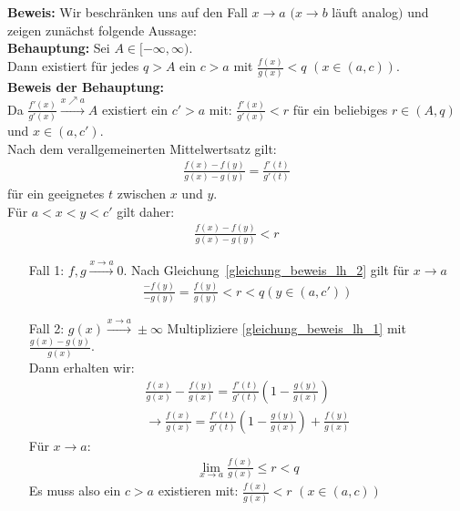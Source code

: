 \begin{Satz}
{	\textbf{Beweis:} Wir beschränken uns auf den Fall $x \rightarrow a$ 
	$(x \rightarrow b$ läuft analog$)$ und zeigen zunächst folgende Aussage: \\
	\textbf{Behauptung:} Sei $A \in [-\infty, \infty)$. \\ 
	Dann existiert für jedes $q > A$ ein $c > a$ mit $\frac{f(x)}{g(x)} < q$ $(x\in (a,c))$. \\
	\textbf{Beweis der Behauptung:} \\
	Da $\frac{f'(x)}{g'(x)} \overset{x \nearrow a}{\rightarrow} A$ 
	existiert ein $c' > a$ mit: $\frac{f'(x)}{g'(x)}<r$ für ein beliebiges 
	$r \in (A,q)$ und $x \in (a,c')$.\\
	Nach dem verallgemeinerten Mittelwertsatz gilt:
	\begin{align}
		\label{gleichung_beweis_lh_1}
		\frac{f(x)-f(y)}{g(x)-g(y)} = \frac{f'(t)}{g'(t)}
	\end{align}
	für ein geeignetes $t$ zwischen $x$ und $y$. \\
	Für $a < x < y <c'$ gilt daher:
	\begin{align}
		\label{gleichung_beweis_lh_2}
		\frac{f(x)-f(y)}{g(x)-g(y)} < r
	\end{align}
	\begin{itemize}
		\item[Fall 1:] $f,g \overset{x \rightarrow a}{\rightarrow} 0$. 
		Nach Gleichung~\eqref{gleichung_beweis_lh_2}
		gilt für $x \rightarrow a$ 
		\begin{align*}
			\frac{-f(y)}{-g(y)} = \frac{f(y)}{g(y)} < r <q (y \in (a, c'))
		\end{align*}
		\item[Fall 2:] $g(x) \overset{x \rightarrow a}{\rightarrow}\pm \infty$
		Multipliziere \eqref{gleichung_beweis_lh_1} mit
		$\frac{g(x)-g(y)}{g(x)}$. \\
		Dann erhalten wir:
		\begin{align*}
			\frac{f(x)}{g(x)} - \frac{f(y)}{g(x)} = \frac{f'(t)}{g'(t)}
			\left( 1 - \frac{g(y)}{g(x)}\right) \\
			 \rightarrow \frac{f(x)}{g(x)} = \frac{f'(t)}{g'(t)} \left(
			1- \frac{g(y)}{g(x)}\right) + \frac{f(y)}{g(x)}
		\end{align*}
		Für $x \rightarrow a$:
		\begin{align*}
			\lim\limits_{x\rightarrow a}{\frac{f(x)}{g(x)}}\leq r < q
		\end{align*}
		Es muss also ein $ c > a$ existieren mit: 
		$\frac{f(x)}{g(x)} <r$ $(x \in (a,c))$ \\

\end{itemize}}
\end{Satz}
